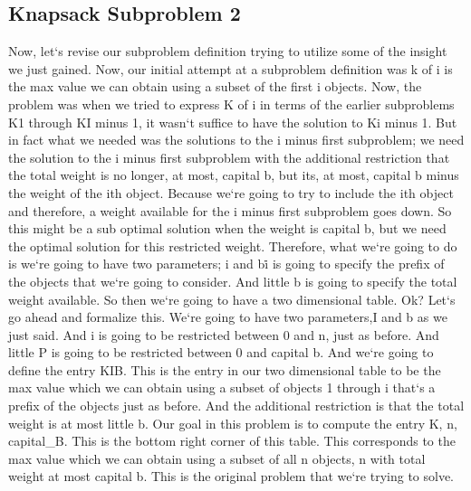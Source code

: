 \subsection{Knapsack  Subproblem 2}
Now, let`s revise our subproblem definition trying to utilize some of the insight we just gained.
Now, our initial attempt at a subproblem definition was k of i is the max value we can obtain using a subset of the first i objects.
Now, the problem was when we tried to express K of i in terms of the earlier subproblems K1 through KI minus 1, it wasn`t suffice to have the solution to Ki minus 1.
But in fact what we needed was the solutions to the i minus first subproblem; we need the solution to the i minus first subproblem with the additional restriction that the total weight is no longer, at most, capital b, but its, at most, capital b minus the weight of the ith object.
Because we`re going to try to include the ith object and therefore, a weight available for the i minus first subproblem goes down.
So this might be a sub optimal solution when the weight is capital b, but we need the optimal solution for this restricted weight.
Therefore, what we`re going to do is we`re going to have two parameters; i and b\. i is going to specify the prefix of the objects that we`re going to consider.
And little b is going to specify the total weight available.
So then we`re going to have a two dimensional table.
Ok? Let`s go ahead and formalize this.
We`re going to have two parameters,I and b as we just said.
And i is going to be restricted between 0 and n, just as before.
And little P is going to be restricted between 0 and capital b.
And we`re going to define the entry KIB\@.
This is the entry in our two dimensional table to be the max value which we can obtain using a subset of objects 1 through i that`s a prefix of the objects just as before.
And the additional restriction is that the total weight is at most little b.
Our goal in this problem is to compute the entry K, n, capital\_B\@.
This is the bottom right corner of this table.
This corresponds to the max value which we can obtain using a subset of all n objects, n with total weight at most capital b.
This is the original problem that we`re trying to solve.

